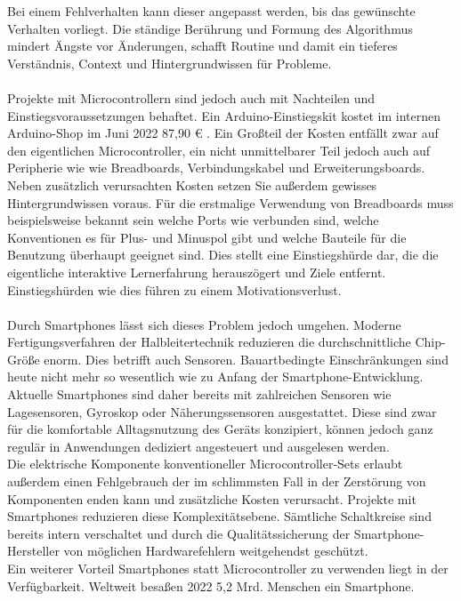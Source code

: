 \documentclass[11pt,a4paper]{report}
\begin{document}
Bei einem Fehlverhalten kann dieser angepasst werden, bis das gewünschte Verhalten vorliegt.
Die ständige Berührung und Formung des Algorithmus mindert Ängste vor Änderungen, schafft Routine und damit ein tieferes Verständnis, Context und Hintergrundwissen für Probleme.
\\\\
Projekte mit Microcontrollern sind jedoch auch mit Nachteilen und Einstiegsvoraussetzungen behaftet.
Ein Arduino-Einstiegskit kostet im internen Arduino-Shop im Juni 2022 87,90 € \cite{arduino_kit}.
Ein Großteil der Kosten entfällt zwar auf den eigentlichen Microcontroller, ein nicht unmittelbarer Teil jedoch auch auf Peripherie wie wie Breadboards, Verbindungskabel und Erweiterungsboards.
Neben zusätzlich verursachten Kosten setzen Sie außerdem gewisses Hintergrundwissen voraus.
Für die erstmalige Verwendung von Breadboards muss beispielsweise bekannt sein welche Ports wie verbunden sind, welche Konventionen es für Plus- und Minuspol gibt und welche Bauteile für die Benutzung überhaupt geeignet sind.
Dies stellt eine Einstiegshürde dar, die die eigentliche interaktive Lernerfahrung herauszögert und Ziele entfernt.
Einstiegshürden wie dies führen zu einem Motivationsverlust.
\\\\
Durch Smartphones lässt sich dieses Problem jedoch umgehen.
Moderne Fertigungsverfahren der Halbleitertechnik reduzieren die durchschnittliche Chip-Größe enorm.
Dies betrifft auch Sensoren.
Bauartbedingte Einschränkungen sind heute nicht mehr so wesentlich wie zu Anfang der Smartphone-Entwicklung.
Aktuelle Smartphones sind daher bereits mit zahlreichen Sensoren wie Lagesensoren, Gyroskop oder Näherungssensoren ausgestattet.
Diese sind zwar für die komfortable Alltagsnutzung des Geräts konzipiert, können jedoch ganz regulär in Anwendungen dediziert angesteuert und ausgelesen werden.
\\
Die elektrische Komponente konventioneller Microcontroller-Sets erlaubt außerdem einen Fehlgebrauch der im schlimmsten Fall in der Zerstörung von Komponenten enden kann und zusätzliche Kosten verursacht.
Projekte mit Smartphones reduzieren diese Komplexitätsebene.
Sämtliche Schaltkreise sind bereits intern verschaltet und durch die Qualitätssicherung der Smartphone-Hersteller von möglichen Hardwarefehlern weitgehendst geschützt.
\\
Ein weiterer Vorteil Smartphones statt Microcontroller zu verwenden liegt in der Verfügbarkeit.
Weltweit besaßen 2022 5,2 Mrd. Menschen ein Smartphone. \cite{smartphone_users}
\end{document}

